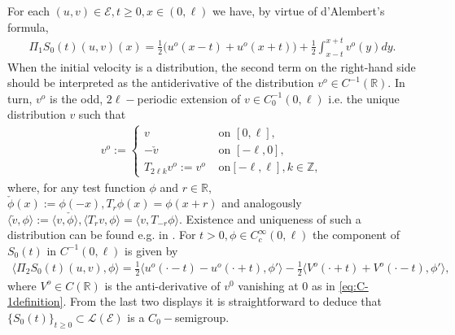 \documentclass[10pt, reqno]{amsart}
\newcommand{\R}{\mathbb{R}}
\newcommand{\e}{\mathcal{E}}
\newcommand{\blangle}{\big\langle}
\newcommand{\brangle}{\big\rangle}
\theoremstyle{definition}
\numberwithin{lem}{section}
\numberwithin{cor}{section}
\numberwithin{prop}{section}
\numberwithin{thm}{section}
\numberwithin{dfn}{section}
\begin{document}
 For each $(u,v)\in\e, t\geq 0, x\in(0,\ell)$ we have, by virtue of d'Alembert's formula,
 \begin{equation}\label{equation:D'Alembert1}
\begin{aligned}
    \Pi_1S_0(t)(u,v)(x)=\frac{1}{2}\bigg(u^o(x-t)+u^o(x+t)\bigg)+\frac{1}{2}\int^{x+t}_{x-t} v^o(y)dy.
\end{aligned}
 \end{equation}
 When the initial velocity is a distribution, the second term on the right-hand side should be interpreted as the antiderivative of the distribution $v^o\in C^{-1}(\R).$ In turn, $v^o$ is the odd, $2\ell-$periodic extension of $v\in C^{-1}_0(0,\ell)$ i.e. the unique distribution $v$ such that
 \begin{equation*}\label{eq:oddextension}
     \begin{aligned}
	v^o := \begin{cases}
		v & \text{ on } [0,\ell],\\
		-\check{v} & \text{ on } [-\ell,0],\\
		T_{2\ell k} v^o := v^o & \text { on} [-\ell, \ell] , k \in \mathbb{Z},
	\end{cases}
     \end{aligned}
 \end{equation*}
 where, for any test function $\phi$ and $r\in\R,$ $\check{\phi}(x):=\phi(-x), T_r\phi(x)=\phi(x+r)$ and analogously $\langle \check{v},\phi\rangle:=\langle v,\check{\phi}\rangle, \langle T_rv, \phi\rangle=\langle v, T_{-r}\phi\rangle.$ Existence and uniqueness of such a distribution can be found e.g. in \cite[Theorem 24.1]{treves2016topological}.
For $t>0, \phi\in C_c^\infty(0,\ell)$ the component of $S_0(t)$ in $C^{-1}(0,\ell)$ is given by \begin{equation}\label{equation:D'Alembert2}
\begin{aligned}
    \blangle \Pi_2S_0(t)(u,v), \phi\brangle=\frac{1}{2}\blangle u^o(\cdot-t)-u^o(\cdot+t), \phi'\brangle
-\frac{1}{2}\blangle  V^o(\cdot+t)+V^o(\cdot-t), \phi'\brangle, 
\end{aligned}
 \end{equation}
 where $V^o\in C(\R)$ is the anti-derivative of $v^0$ vanishing at $0$ as in \eqref{eq:C-1definition}.
 From the last two displays it is straightforward to deduce that $\{S_0(t)\}_{t\geq 0}\subset\mathscr{L}(\e)$ is a $C_0-$semigroup.
 
\end{document}
